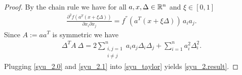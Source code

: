 \begin{proof}
  By the chain rule 
  we have
  for all $a, x, \Delta \in \mathbb{R}^n$ and $\xi \in [0,1]$
  \begin{gather}
    \label{syu_2.0}
   \frac{\partial^2  f(a^T (x + \xi \Delta)) }{\partial x_i \partial x_j}=
    f^{''}(a^T (x + \xi \Delta))\, a_i a_j.
  \end{gather}
  Since 
  $A:= a a^T$ is symmetric
  we have
  \begin{gather}
    \label{syu_2.1}
    \Delta^T A\ \Delta 
    =
    2
    \sum_{
    \begin{smallmatrix}
      i,j = 1 \\ 
      i \neq j
    \end{smallmatrix}
    }
    ^{n}
    a_i a_j \Delta_i \Delta_j
    + 
    \sum_{i=1}^{n} 
    a_i^2 \Delta_i^2.
  \end{gather}
  Plugging \eqref{syu_2.0} and \eqref{syu_2.1} into \eqref{syu_taylor}
  yields
  \eqref{syu_2.result}.
\end{proof}

